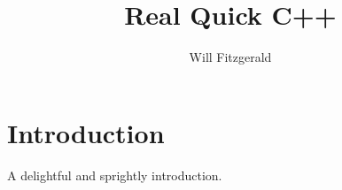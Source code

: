 \documentclass[11pt]{article}
\title{Real Quick C++}
\author{Will Fitzgerald}
\newcommand {\marginal}[1]{\mbox{}\marginpar{\raggedleft\hspace{0pt}#1}}
\begin{document}
\maketitle
\tableofcontents

\newpage

\section{Introduction}

A delightful and sprightly introduction.


%                   
\end{document}
